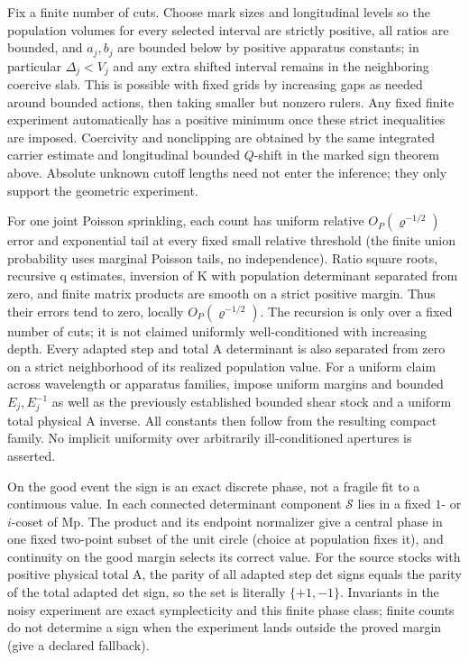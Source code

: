\documentclass[11pt]{article}
\begin{document}
Fix a finite number of cuts. Choose mark sizes and longitudinal levels so the population volumes for every selected interval are strictly positive, all ratios are bounded, and \(a_j,b_j\) are bounded below by positive apparatus constants; in particular \(\Delta_j<V_j\) and any extra shifted interval remains in the neighboring coercive slab. This is possible with fixed grids by increasing gaps as needed around bounded actions, then taking smaller but nonzero rulers. Any fixed finite experiment automatically has a positive minimum once these strict inequalities are imposed. Coercivity and nonclipping are obtained by the same integrated carrier estimate and longitudinal bounded \(Q\)-shift in the marked sign theorem above. Absolute unknown cutoff lengths need not enter the inference; they only support the geometric experiment.

For one joint Poisson sprinkling, each count has uniform relative \(O_P(\varrho^{-1/2})\) error and exponential tail at every fixed small relative threshold (the finite union probability uses marginal Poisson tails, no independence). Ratio square roots, recursive q estimates, inversion of K with population determinant separated from zero, and finite matrix products are smooth on a strict positive margin. Thus their errors tend to zero, locally \(O_P(\varrho^{-1/2})\). The recursion is only over a fixed number of cuts; it is not claimed uniformly well-conditioned with increasing depth. Every adapted step and total A determinant is also separated from zero on a strict neighborhood of its realized population value. For a uniform claim across wavelength or apparatus families, impose uniform margins and bounded \(E_j,E_j^{-1}\) as well as the previously established bounded shear stock and a uniform total physical A inverse. All constants then follow from the resulting compact family. No implicit uniformity over arbitrarily ill-conditioned apertures is asserted.

On the good event the sign is an exact discrete phase, not a fragile fit to a continuous value. In each connected determinant component \(\mathcal S\) lies in a fixed \(1\)- or \(i\)-coset of Mp. The product and its endpoint normalizer give a central phase in one fixed two-point subset of the unit circle (choice at population fixes it), and continuity on the good margin selects its correct value. For the source stocks with positive physical total A, the parity of all adapted step det signs equals the parity of the total adapted det sign, so the set is literally \(\{+1,-1\}\). Invariants in the noisy experiment are exact symplecticity and this finite phase class; finite counts do not determine a sign when the experiment lands outside the proved margin (give a declared fallback).
\end{document}
